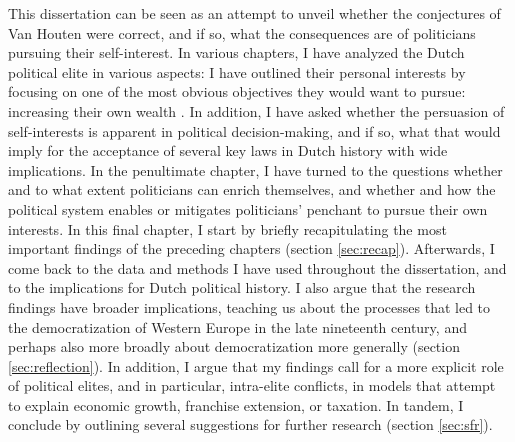 This dissertation can be seen as an attempt to unveil whether the conjectures of Van Houten were correct, and if so, what the consequences are of politicians pursuing their self-interest. In various chapters, I have analyzed the Dutch political elite in various aspects: I have outlined their personal interests by focusing on one of the most obvious objectives they would want to pursue: increasing their own wealth \citep{buchanan1989essays}. In addition, I have asked whether the persuasion of self-interests is apparent in political decision-making, and if so, what that would imply for the acceptance of several key laws in Dutch history with wide implications. In the penultimate chapter, I have turned to the questions whether and to what extent politicians can enrich themselves, and whether and how the political system enables or mitigates politicians' penchant to pursue their own interests. In this final chapter, I start by briefly recapitulating the most important findings of the preceding chapters (section \ref{sec:recap}). Afterwards, I come back to the data and methods I have used throughout the dissertation, and to the implications for Dutch political history. I also argue that the research findings have broader implications, teaching us about the processes that led to the democratization of Western Europe in the late nineteenth century, and perhaps also more broadly about democratization more generally (section \ref{sec:reflection}). In addition, I argue that my findings call for a more explicit role of political elites, and in particular, intra-elite conflicts, in models that attempt to explain economic growth, franchise extension, or taxation. In tandem, I conclude by outlining several suggestions for further research (section \ref{sec:sfr}). 





